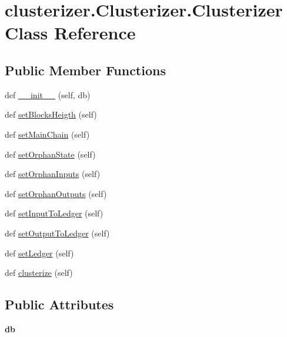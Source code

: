 \hypertarget{classclusterizer_1_1Clusterizer_1_1Clusterizer}{}\section{clusterizer.\+Clusterizer.\+Clusterizer Class Reference}
\label{classclusterizer_1_1Clusterizer_1_1Clusterizer}
\subsection*{Public Member Functions}
\begin{DoxyCompactItemize}
\item 
def \hyperlink{classclusterizer_1_1Clusterizer_1_1Clusterizer_ab0f3ab9257a9ade1d79604b9332ad35c}{\+\_\+\+\_\+init\+\_\+\+\_\+} (self, db)
\item 
def \hyperlink{classclusterizer_1_1Clusterizer_1_1Clusterizer_ad5d18db2b008382c2c07582db6316c6c}{set\+Blocks\+Heigth} (self)
\item 
def \hyperlink{classclusterizer_1_1Clusterizer_1_1Clusterizer_a75ebe0b9bbc54eaeae937949ba38fc5f}{set\+Main\+Chain} (self)
\item 
def \hyperlink{classclusterizer_1_1Clusterizer_1_1Clusterizer_ab3810600fe53455d9c6562ea85726023}{set\+Orphan\+State} (self)
\item 
def \hyperlink{classclusterizer_1_1Clusterizer_1_1Clusterizer_ad21a84db5b11962e0c5e76be48c73872}{set\+Orphan\+Inputs} (self)
\item 
def \hyperlink{classclusterizer_1_1Clusterizer_1_1Clusterizer_a2d434b4b40f91007a57cbc04e47b64b9}{set\+Orphan\+Outputs} (self)
\item 
def \hyperlink{classclusterizer_1_1Clusterizer_1_1Clusterizer_af172c3f17ff084845b4260d5f9d77282}{set\+Input\+To\+Ledger} (self)
\item 
def \hyperlink{classclusterizer_1_1Clusterizer_1_1Clusterizer_a6f808a0c68966315e41708063ea568c2}{set\+Output\+To\+Ledger} (self)
\item 
def \hyperlink{classclusterizer_1_1Clusterizer_1_1Clusterizer_aa349128296c08f7968b9fa7a6bfcb425}{set\+Ledger} (self)
\item 
def \hyperlink{classclusterizer_1_1Clusterizer_1_1Clusterizer_a73f1d65c4223f1f1dd57eac0880f4194}{clusterize} (self)
\end{DoxyCompactItemize}
\subsection*{Public Attributes}
\begin{DoxyCompactItemize}
\item 
\hypertarget{classclusterizer_1_1Clusterizer_1_1Clusterizer_a05be8ce254addd0e15aa76b69bd00348}{}{\bfseries db}\label{classclusterizer_1_1Clusterizer_1_1Clusterizer_a05be8ce254addd0e15aa76b69bd00348}

\end{DoxyCompactItemize}


